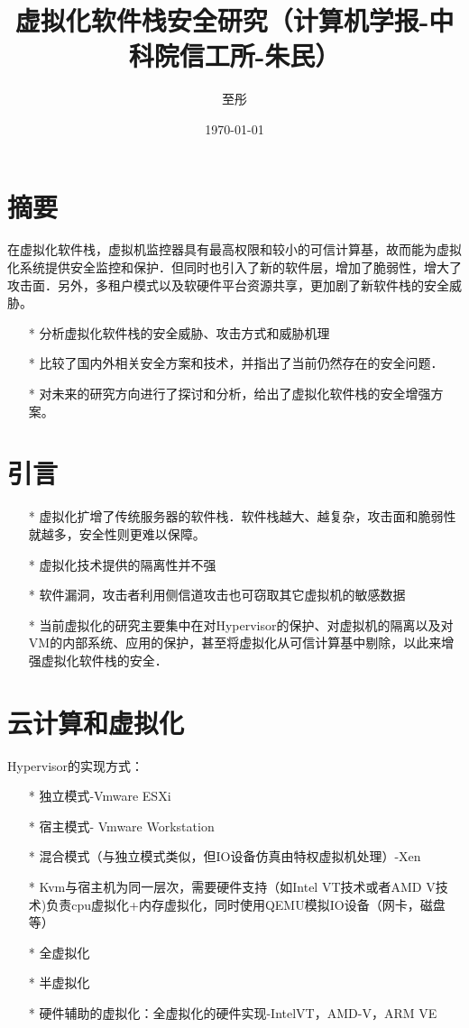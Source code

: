 \documentclass[UTF8]{ctexart}
\title{\heiti 虚拟化软件栈安全研究（计算机学报-中科院信工所-朱民）}
\author{\kaishu 至彤}
\date{\today}
\begin{document}
    
    \maketitle

    \clearpage
    \section{摘要}\label{sec:diyijie}
	在虚拟化软件栈，虚拟机监控器具有最高权限和较小的可信计算基，故而能为虚拟化系统提供安全监控和保护．但同时也引入了新的软件层，增加了脆弱性，增大了攻击面．另外，多租户模式以及软硬件平台资源共享，更加剧了新软件栈的安全威胁。
	\begin{itemize}
	\item[*] 分析虚拟化软件栈的安全威胁、攻击方式和威胁机理
	\item[*] 比较了国内外相关安全方案和技术，并指出了当前仍然存在的安全问题．
	\item[*] 对未来的研究方向进行了探讨和分析，给出了虚拟化软件栈的安全增强方案。
	\end{itemize}
	\clearpage

    \section{引言}\label{sec:dierjie}
	\begin{itemize}
	\item[*] 虚拟化扩增了传统服务器的软件栈．软件栈越大、越复杂，攻击面和脆弱性就越多，安全性则更难以保障。
	\item[*] 虚拟化技术提供的隔离性并不强
	\item[*] 软件漏洞，攻击者利用侧信道攻击也可窃取其它虚拟机的敏感数据
	\item[*] 当前虚拟化的研究主要集中在对Hypervisor的保护、对虚拟机的隔离以及对VM的内部系统、应用的保护，甚至将虚拟化从可信计算基中剔除，以此来增强虚拟化软件栈的安全．
	\end{itemize}
	\clearpage

	\section{云计算和虚拟化}\label{sec:disnajie}
	Hypervisor的实现方式：

	\begin{itemize}
	\item[*] 独立模式-Vmware ESXi
	\item[*] 宿主模式- Vmware Workstation
	\item[*] 混合模式（与独立模式类似，但IO设备仿真由特权虚拟机处理）-Xen
	\item[*] Kvm与宿主机为同一层次，需要硬件支持（如Intel VT技术或者AMD V技术)负责cpu虚拟化+内存虚拟化，同时使用QEMU模拟IO设备（网卡，磁盘等）
	\item[*] 全虚拟化
	\item[*] 半虚拟化
	\item[*] 硬件辅助的虚拟化：全虚拟化的硬件实现-IntelVT，AMD-V，ARM VE
	\end{itemize}
	\clearpage
\end{document}
